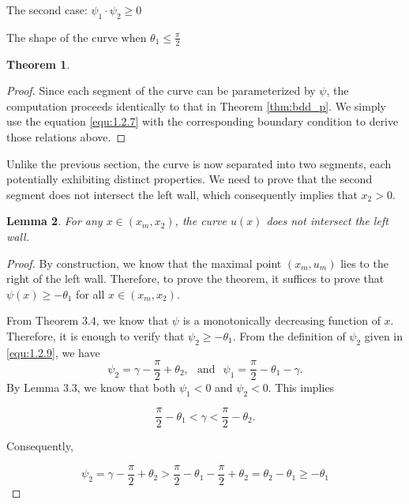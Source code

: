 \documentclass[letterpaper,reqno,10pt,twoside]{amsart}
\newtheorem{theorem}{Theorem}[section]
\newtheorem{lemma}[theorem]{Lemma}
\theoremstyle{definition}
\theoremstyle{remark}
\begin{document}
\begin{section}{The second case: $\psi_1\cdot \psi_2\geq 0$ }
\begin{subsection}{The shape of the curve when $\theta_1\leq \frac{\pi}{2}$}
\begin{theorem}
            
        \end{theorem}
        
        \begin{proof}
           Since each segment of the curve can be parameterized by $\psi$, the computation proceeds identically to that in Theorem \ref{thm:bdd_p}. We simply use the equation \eqref{equ:1.2.7} with the corresponding boundary condition to derive those relations above.
        \end{proof}

        Unlike the previous section, the curve is now separated into two segments, each potentially exhibiting distinct properties. We need to prove that the second segment does not intersect the left wall, which consequently implies that $x_2>0$. 

        \begin{lemma}

        For any $x\in(x_m,x_2)$, the curve $u(x)$ does not intersect the left wall.

        \end{lemma}

        \begin{proof}

             By construction, we know that the maximal point $(x_m,u_m)$ lies to the right of the left wall. Therefore, to prove the theorem, it suffices to prove that $\psi(x)\geq -\theta_1$ for all $x\in (x_m,x_2)$.

            From Theorem 3.4, we know that $\psi$ is a monotonically decreasing function of $x$. Therefore, it is enough to verify that $\psi_2\geq -\theta_1$. From the definition of $\psi_2$ given in \eqref{equ:1.2.9}, we  have
            \begin{equation}
                \psi_2=\gamma-\frac{\pi}{2}+\theta_2,~~\operatorname{and}~~\psi_1=\frac{\pi}{2}-\theta_1-\gamma.
            \end{equation}
             By Lemma 3.3, we know that both $\psi_1<0$ and $\psi_2<0$. This implies

            \begin{equation*}
                \frac{\pi}{2}-\theta_1<\gamma<\frac{\pi}{2}-\theta_2.
            \end{equation*}

            \noindent Consequently,

            \begin{equation*}
               \psi_{2}=\gamma-\frac{\pi}{2}+\theta_2> \frac{\pi}{2}-\theta_1-\frac{\pi}{2}+\theta_2=\theta_2-\theta_1\geq -\theta_1 
            \end{equation*}


\end{proof}
\end{subsection}
\end{section}
\end{document}
